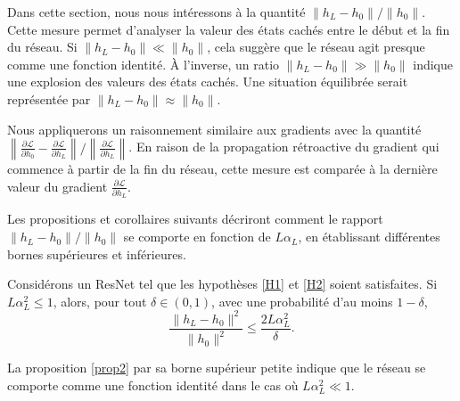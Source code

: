Dans cette section, nous nous intéressons à la quantité $ {\left\| h_L - h_0 \right\|} / {\left\| h_0 \right\|}$. Cette mesure permet d'analyser la valeur des états cachés entre le début et la fin du réseau. Si $\left\| h_L - h_0 \right\| \ll \left\| h_0 \right\|$, cela suggère que le réseau agit presque comme une fonction identité. À l'inverse, un ratio $\left\| h_L - h_0 \right\| \gg \left\| h_0 \right\|$ indique une explosion des valeurs des états cachés. Une situation équilibrée serait représentée par $\left\| h_L - h_0 \right\| \approx \left\| h_0 \right\|$.

Nous appliquerons un raisonnement similaire aux gradients avec la quantité ${\left\| \frac{\partial \mathcal{L}}{\partial h_0} - \frac{\partial \mathcal{L}}{\partial h_L} \right\|} / {\left\| \frac{\partial \mathcal{L}}{\partial h_L} \right\|}$. En raison de la propagation rétroactive du gradient qui commence à partir de la fin du réseau, cette mesure est comparée à la dernière valeur du gradient $\frac{\partial \mathcal{L}}{\partial h_L}$.

Les propositions et corollaires suivants décriront comment le rapport ${\left\| h_L - h_0 \right\|} / {\left\| h_0 \right\|}$ se comporte en fonction de $L\alpha_L$, en établissant différentes bornes supérieures et inférieures.


\begin{proposition}\label{prop2}
    Considérons un ResNet \cite{torchvision2016} tel que les hypothèses \ref{H1} et \ref{H2} soient satisfaites.
    Si \( L\alpha_L^2 \leq 1 \), alors, pour tout \( \delta \in (0, 1) \), avec une probabilité d'au moins \( 1 - \delta \),
    \[
        \frac{\|h_L - h_0\|^2}{\|h_0\|^2} \leq \frac{2L\alpha_L^2}{\delta}
    .\]
\end{proposition}
La proposition \ref{prop2} par sa borne supérieur petite indique que le réseau se comporte comme une fonction identité dans le cas où $ L \alpha ^2 _L \ll 1 $.


